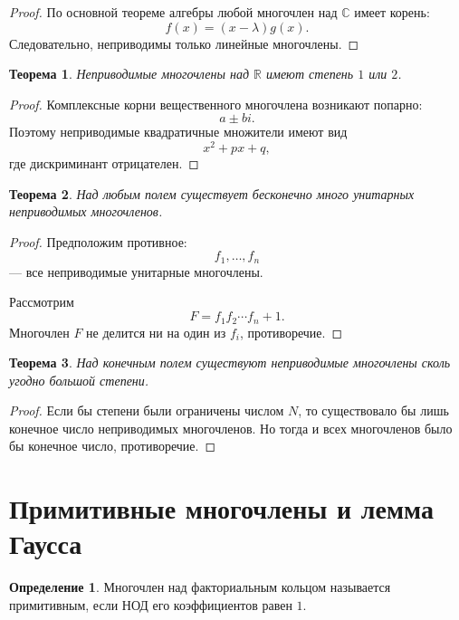 \documentclass[12pt, a4paper]{article}
\newtheorem{theorem}{Теорема}
\theoremstyle{definition}
\newtheorem{definition}{Определение}
\theoremstyle{remark}
\newcommand{\R}{\mathbb{R}}
\renewcommand{\C}{\mathbb{C}}
\begin{document}
\begin{proof}
	По основной теореме алгебры любой многочлен над $\C$ имеет корень:
	\[
	f(x)=(x-\lambda)g(x).
	\]
	Следовательно, неприводимы только линейные многочлены.
\end{proof}

\begin{theorem}
	Неприводимые многочлены над $\R$ имеют степень $1$ или $2$.
\end{theorem}

\begin{proof}
	Комплексные корни вещественного многочлена возникают попарно:
	\[
	a\pm bi.
	\]
	Поэтому неприводимые квадратичные множители имеют вид
	\[
	x^2+px+q,
	\]
	где дискриминант отрицателен.
\end{proof}

\begin{theorem}
	Над любым полем существует бесконечно много унитарных неприводимых
	многочленов.
\end{theorem}

\begin{proof}
	Предположим противное:
	\[
	f_1,\dots,f_n
	\]
	--- все неприводимые унитарные многочлены.
	
	Рассмотрим
	\[
	F=f_1f_2\cdots f_n+1.
	\]
	Многочлен $F$ не делится ни на один из $f_i$, противоречие.
\end{proof}

\begin{theorem}
	Над конечным полем существуют неприводимые многочлены сколь угодно большой степени.
\end{theorem}

\begin{proof}
	Если бы степени были ограничены числом $N$, то существовало бы лишь конечное
	число неприводимых многочленов. Но тогда и всех многочленов было бы конечное
	число, противоречие.
\end{proof}

\section{Примитивные многочлены и лемма Гаусса}

\begin{definition}
	Многочлен над факториальным кольцом называется примитивным, если НОД его
	коэффициентов равен $1$.
\end{definition}
\end{document}
